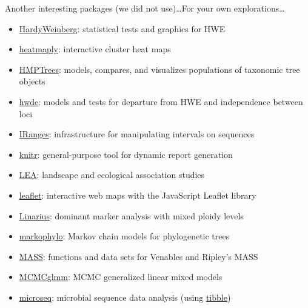 \documentclass[compress, xelatex, 11pt, xcolor=svgnames, aspectratio=169, url={hyphens, lowtilde}]{beamer}
\begin{document}
\begin{frame}[allowframebreaks]{Another interesting packages (we did not use)\ldots}{For your own explorations\ldots}
\begin{itemize}
		\item \href{https://CRAN.R-project.org/package=HardyWeinberg}{HardyWeinberg}: statistical tests and graphics for HWE
		\item \href{https://CRAN.R-project.org/package=heatmaply}{heatmaply}: interactive cluster heat maps
		\item \href{https://CRAN.R-project.org/package=HMPTrees}{HMPTrees}: models, compares, and visualizes populations of taxonomic tree objects
		\item \href{https://CRAN.R-project.org/package=hwde}{hwde}: models and tests for departure from HWE and independence between loci
		\item \href{https://bioconductor.org/packages/release/bioc/html/IRanges.html}{IRanges}: infrastructure for manipulating intervals on sequences
		\item \href{https://CRAN.R-project.org/package=knitr}{knitr}: general-purpose tool for dynamic report generation
		\item \href{https://www.bioconductor.org/packages/release/bioc/html/LEA.html}{LEA}: landscape and ecological association studies
		\item \href{https://CRAN.R-project.org/package=leaflet}{leaflet}: interactive web maps with the JavaScript Leaflet library
		\item \href{https://github.com/giby/Linarius}{Linarius}: dominant marker analysis with mixed ploidy levels
		\item \href{https://CRAN.R-project.org/package=markophylo}{markophylo}: Markov chain models for phylogenetic trees
		\item \href{https://CRAN.R-project.org/package=MASS}{MASS}: functions and data sets for Venables and Ripley's MASS
		\item \href{https://CRAN.R-project.org/package=MCMCglmm}{MCMCglmm}: MCMC generalized linear mixed models
		\item \href{https://CRAN.R-project.org/package=microseq}{microseq}: microbial sequence data analysis (using \href{https://CRAN.R-project.org/package=tibble}{tibble})

\end{itemize}
\end{frame}
\end{document}
